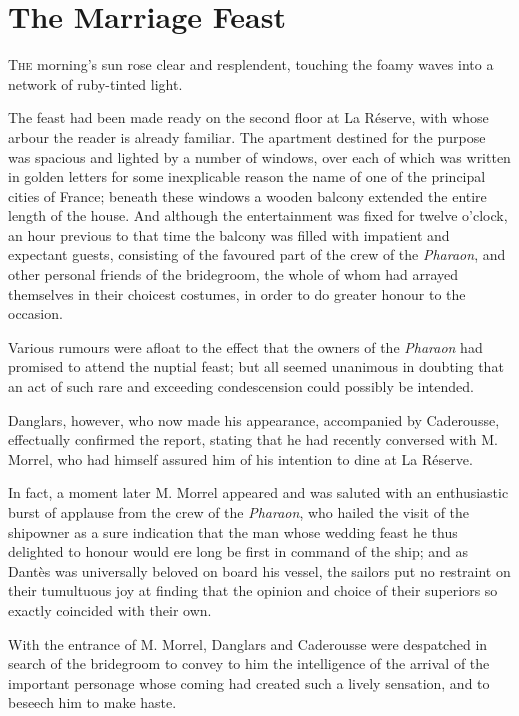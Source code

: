\chapter{The Marriage Feast} 

 \lettrine{T}{he} morning's sun rose clear and resplendent, touching the foamy waves into a network of ruby-tinted light. 

\zz
 The feast had been made ready on the second floor at La Réserve, with whose arbour the reader is already familiar. The apartment destined for the purpose was spacious and lighted by a number of windows, over each of which was written in golden letters for some inexplicable reason the name of one of the principal cities of France; beneath these windows a wooden balcony extended the entire length of the house. And although the entertainment was fixed for twelve o'clock, an hour previous to that time the balcony was filled with impatient and expectant guests, consisting of the favoured part of the crew of the \textit{Pharaon}, and other personal friends of the bridegroom, the whole of whom had arrayed themselves in their choicest costumes, in order to do greater honour to the occasion. 

 Various rumours were afloat to the effect that the owners of the \textit{Pharaon} had promised to attend the nuptial feast; but all seemed unanimous in doubting that an act of such rare and exceeding condescension could possibly be intended. 

 Danglars, however, who now made his appearance, accompanied by Caderousse, effectually confirmed the report, stating that he had recently conversed with M. Morrel, who had himself assured him of his intention to dine at La Réserve. 

 In fact, a moment later M. Morrel appeared and was saluted with an enthusiastic burst of applause from the crew of the \textit{Pharaon}, who hailed the visit of the shipowner as a sure indication that the man whose wedding feast he thus delighted to honour would ere long be first in command of the ship; and as Dantès was universally beloved on board his vessel, the sailors put no restraint on their tumultuous joy at finding that the opinion and choice of their superiors so exactly coincided with their own. 

 With the entrance of M. Morrel, Danglars and Caderousse were despatched in search of the bridegroom to convey to him the intelligence of the arrival of the important personage whose coming had created such a lively sensation, and to beseech him to make haste. 

